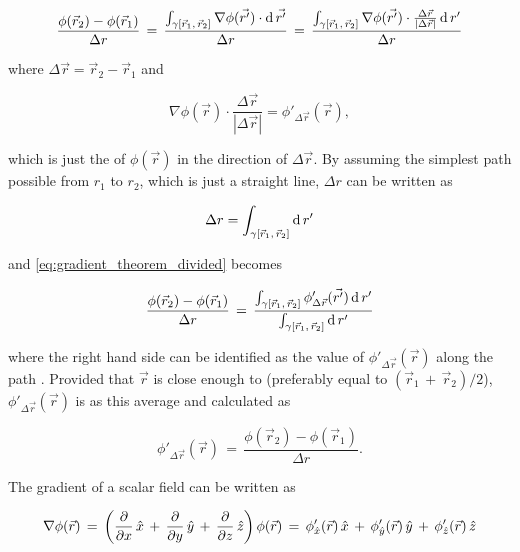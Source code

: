 \begin{equation} \label{eq:gradient_theorem_divided}
\frac{\phi(\vec{r}_2)-\phi(\vec{r}_1)}{\Delta r} \,=\, \frac{\int_{\gamma[\vec{r}_1,\,\vec{r}_2]}\nabla\phi(\vec{r'})\cdot \operatorname{d}\vec{r'}}{\Delta r} \,=\, \frac{\int_{\gamma[\vec{r}_1,\,\vec{r}_2]}\nabla\phi(\vec{r'})\cdot\frac{\Delta\vec{r}}{|\Delta\vec{r}|} \operatorname{d} r'}{\Delta r}
\end{equation}

where $\Delta\vec{r} = \vec{r}_2 -  \vec{r}_1$ and

\begin{equation}
\nabla\phi(\vec{r})\cdot\frac{\Delta\vec{r}}{|\Delta\vec{r}|} = \phi'_{\Delta\vec{r}}(\vec{r}),
\end{equation}

which is just the \derivative of $\phi(\vec{r})$ in the direction of $\Delta\vec{r}$. By assuming the simplest path possible from $r_1$ to $r_2$, which is just a straight line, $\Delta r$ can be written as

\begin{equation}
\Delta r = \int_{\gamma[\vec{r}_1,\,\vec{r}_2]}\operatorname{d} r'
\end{equation}

and \eqref{eq:gradient_theorem_divided} becomes

\begin{equation} \label{eq:phi_derivative_integral}
\frac{\phi(\vec{r}_2)-\phi(\vec{r}_1)}{\Delta r} \,=\, \frac{\int_{\gamma[\vec{r}_1,\,\vec{r}_2]}\phi'_{\Delta\vec{r}}(\vec{r'})\operatorname{d} r'}{\int_{\gamma[\vec{r}_1,\,\vec{r}_2]}\operatorname{d} r'}
\end{equation}

where the right hand side can be identified as the \average value of $\phi'_{\Delta\vec{r}}(\vec{r})$ along the path \textgammapath. Provided that $\vec{r}$ is close enough to \textgammapath (preferably equal to \mbox{$(\vec{r}_1\,+\,\vec{r}_2)/2$}), $\phi'_{\Delta\vec{r}}(\vec{r})$ is \approximated as this average and calculated as

\begin{equation} \label{eq:phi_derivative_final}
\phi'_{\Delta\vec{r}}(\vec{r}) \,=\, \frac{\phi(\vec{r}_2)-\phi(\vec{r}_1)}{\Delta r}.
\end{equation}

The gradient of a scalar field can be written as

\begin{equation} \label{eq:gradient_orthogonal}
\nabla\phi(\vec{r}) \,=\, \left(\frac{\partial}{\partial x}\,\hat{x}\,+\,\frac{\partial}{\partial y}\,\hat{y}\,+\,\frac{\partial}{\partial z}\,\hat{z}\right) \phi(\vec{r}) \,=\, \phi'_{\hat{x}}(\vec{r})\,\hat{x}\,+\,\phi'_{\hat{y}}(\vec{r})\,\hat{y}\,+\,\phi'_{\hat{z}}(\vec{r})\,\hat{z}
\end{equation}


